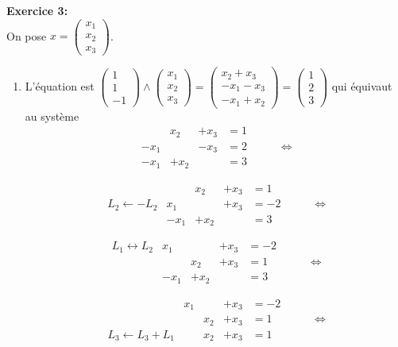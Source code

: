 \documentclass{article}
\begin{document}
\medskip
\noindent
\textbf{Exercice 3:}\\
On pose $x = \begin{pmatrix}
              x_1 \\ x_2 \\ x_3
             \end{pmatrix}$.
\begin{enumerate}
\item 
L'équation est 
$\begin{pmatrix}
  1\\1\\-1
 \end{pmatrix}
 \wedge 
\begin{pmatrix}
 x_1\\x_2\\x_3
\end{pmatrix}
 = 
\begin{pmatrix}
 x_2 +x_3 \\-x_1 -x_3 \\-x_1 +x_2
\end{pmatrix}
 = \begin{pmatrix} 
    1\\2\\3
   \end{pmatrix}
$
qui équivaut au système 
\[ 
\begin{matrix}
      & x_2   & +x_3 & =1 \\
-x_1 &  & -x_3   & =2 \\
-x_1  & +x_2 & & =3
 \end{matrix}
\hspace{1cm} \Leftrightarrow 
\]

\[\begin{matrix}
 &  & x_2  &+x_3 & = 1 \\
L_2 \leftarrow -L_2 &x_1  & & +x_3 & =-2 \\
& -x_1  &+x_2 &  &=3
 \end{matrix} 
\hspace{1cm} \Leftrightarrow 
\]

\[\begin{matrix} 
 L_1 \leftrightarrow  L_2 & x_1 & & +x_3 & =-2 \\
             &      &x_2  &+x_3 & = 1 \\
             & -x_1 &+x_2   &    & =3
 \end{matrix}
\hspace{1cm} \Leftrightarrow 
\]

\[
\begin{matrix} 
                               & x_1 & & +x_3 & =-2 \\
                                 &      &x_2  &+x_3 & = 1 \\
 L_3 \leftarrow L_3 + L_1  &  &x_2   &+x_3    & =1
 \end{matrix}
\hspace{1cm} \Leftrightarrow 
\]


\end{enumerate}
\end{document}
